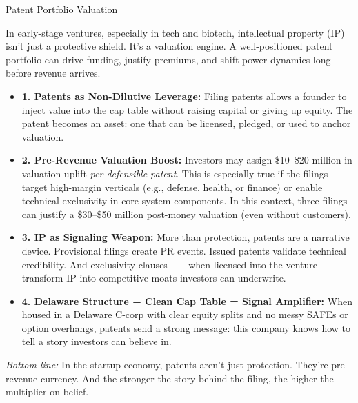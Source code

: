 \begin{TechnicalSidebar}{Patent Portfolio Valuation}

  In early-stage ventures, especially in tech and biotech, intellectual property (IP) isn’t just a protective shield. 
  It’s a valuation engine. A well-positioned patent portfolio can drive funding, justify premiums, and shift power 
  dynamics long before revenue arrives.
  
  \medskip

  \begin{itemize}
  
    \item \textbf{1. Patents as Non-Dilutive Leverage:}  
    Filing patents allows a founder to inject value into the cap table without raising capital or giving up equity. 
    The patent becomes an asset: one that can be licensed, pledged, or used to anchor valuation.
    
    \item \textbf{2. Pre-Revenue Valuation Boost:}  
    Investors may assign \$10–\$20 million in valuation uplift \textit{per defensible patent}. This is especially true 
    if the filings target high-margin verticals (e.g., defense, health, or finance) or enable technical exclusivity 
    in core system components.  In this context, three filings can justify a \$30–\$50 million post-money 
    valuation (even without customers).
    
    \item \textbf{3. IP as Signaling Weapon:}  
    More than protection, patents are a narrative device. Provisional filings create PR events. Issued patents 
    validate technical credibility. And exclusivity clauses --— when licensed into the venture --— transform IP 
    into competitive moats investors can underwrite.
    
    \item \textbf{4. Delaware Structure + Clean Cap Table = Signal Amplifier:}  
    When housed in a Delaware C-corp with clear equity splits and no messy SAFEs or option overhangs, patents 
    send a strong message: this company knows how to tell a story investors can believe in.

  \end{itemize}

  \medskip
  
  \textit{Bottom line:}  
  In the startup economy, patents aren’t just protection. They’re pre-revenue currency.  
  And the stronger the story behind the filing, the higher the multiplier on belief.
  
\end{TechnicalSidebar}






